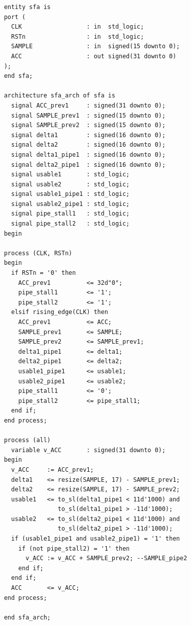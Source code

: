 \begin{table}[t!]
\begin{minipage}[t][22cm][t]{0.51\linewidth}
\begin{verbatim}
      entity sfa is
      port (
        CLK                  : in  std_logic;
        RSTn                 : in  std_logic;
        SAMPLE               : in  signed(15 downto 0);
        ACC                  : out signed(31 downto 0)
      );
      end sfa;
      
      architecture sfa_arch of sfa is
        signal ACC_prev1     : signed(31 downto 0);
        signal SAMPLE_prev1  : signed(15 downto 0);
        signal SAMPLE_prev2  : signed(15 downto 0);
        signal delta1        : signed(16 downto 0);
        signal delta2        : signed(16 downto 0);
        signal delta1_pipe1  : signed(16 downto 0);
        signal delta2_pipe1  : signed(16 downto 0);
        signal usable1       : std_logic;
        signal usable2       : std_logic;
        signal usable1_pipe1 : std_logic;
        signal usable2_pipe1 : std_logic;
        signal pipe_stall1   : std_logic;
        signal pipe_stall2   : std_logic;
      begin
      
      process (CLK, RSTn)
      begin
        if RSTn = '0' then
          ACC_prev1          <= 32d"0";
          pipe_stall1        <= '1';     
          pipe_stall2        <= '1';
        elsif rising_edge(CLK) then
          ACC_prev1          <= ACC;
          SAMPLE_prev1       <= SAMPLE;  
          SAMPLE_prev2       <= SAMPLE_prev1;
          delta1_pipe1       <= delta1;  
          delta2_pipe1       <= delta2;
          usable1_pipe1      <= usable1; 
          usable2_pipe1      <= usable2;
          pipe_stall1        <= '0';     
          pipe_stall2        <= pipe_stall1;
        end if;
      end process;
      
      process (all)
        variable v_ACC       : signed(31 downto 0);
      begin
        v_ACC     := ACC_prev1;
        delta1    <= resize(SAMPLE, 17) - SAMPLE_prev1;
        delta2    <= resize(SAMPLE, 17) - SAMPLE_prev2;
        usable1   <= to_sl(delta1_pipe1 < 11d'1000) and 
                     to_sl(delta1_pipe1 > -11d'1000);
        usable2   <= to_sl(delta2_pipe1 < 11d'1000) and 
                     to_sl(delta2_pipe1 > -11d'1000);
        if (usable1_pipe1 and usable2_pipe1) = '1' then
          if (not pipe_stall2) = '1' then
            v_ACC := v_ACC + SAMPLE_prev2; --SAMPLE_pipe2
          end if;
        end if;
        ACC       <= v_ACC;
      end process;
      
      end sfa_arch;
    \end{verbatim}
    \label{fig:SFAVHDL}
  \end{minipage}
\end{table}

